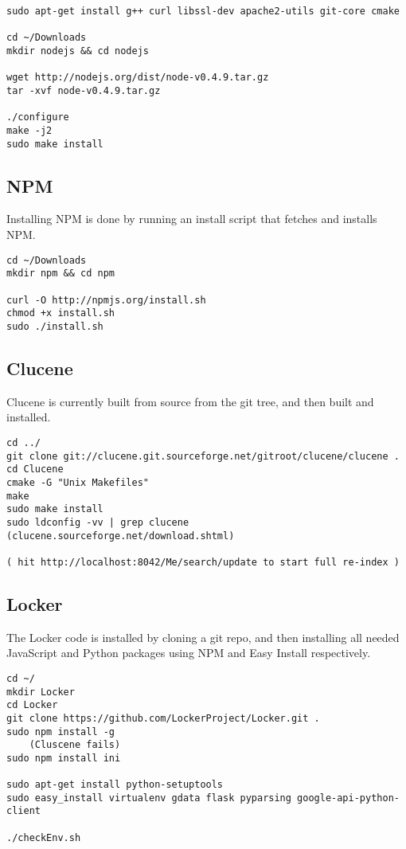 \documentclass[A4paper,11pt]{article}
\begin{document}
\begin{lstlisting}
sudo apt-get install g++ curl libssl-dev apache2-utils git-core cmake

cd ~/Downloads
mkdir nodejs && cd nodejs

wget http://nodejs.org/dist/node-v0.4.9.tar.gz
tar -xvf node-v0.4.9.tar.gz 

./configure
make -j2
sudo make install
\end{lstlisting}

\newpage
\subsection{NPM}
\label{subsec:NPM}

Installing NPM is done by running an install script that fetches and installs NPM.

\begin{lstlisting}
cd ~/Downloads
mkdir npm && cd npm

curl -O http://npmjs.org/install.sh
chmod +x install.sh
sudo ./install.sh
\end{lstlisting}

\subsection{Clucene}
\label{subsec:Clucene}

Clucene is currently built from source from the git tree, and then built and installed.

\begin{lstlisting}
cd ../
git clone git://clucene.git.sourceforge.net/gitroot/clucene/clucene .
cd Clucene
cmake -G "Unix Makefiles"
make
sudo make install
sudo ldconfig -vv | grep clucene
(clucene.sourceforge.net/download.shtml)

( hit http://localhost:8042/Me/search/update to start full re-index )

\end{lstlisting}

\subsection{Locker}
\label{subsec:Locker}

The Locker code is installed by cloning a git repo, and then installing all needed JavaScript and Python packages using NPM and Easy Install respectively.

\begin{lstlisting}
cd ~/
mkdir Locker
cd Locker
git clone https://github.com/LockerProject/Locker.git .
sudo npm install -g
    (Cluscene fails)
sudo npm install ini

sudo apt-get install python-setuptools
sudo easy_install virtualenv gdata flask pyparsing google-api-python-client

./checkEnv.sh

\end{lstlisting}
\end{document}
